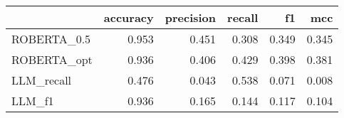 \begin{tabular}{lrrrrr}
\toprule
 & accuracy & precision & recall & f1 & mcc \\
\midrule
ROBERTA_0.5 & 0.953 & 0.451 & 0.308 & 0.349 & 0.345 \\
ROBERTA_opt & 0.936 & 0.406 & 0.429 & 0.398 & 0.381 \\
LLM_recall & 0.476 & 0.043 & 0.538 & 0.071 & 0.008 \\
LLM_f1 & 0.936 & 0.165 & 0.144 & 0.117 & 0.104 \\
\bottomrule
\end{tabular}
